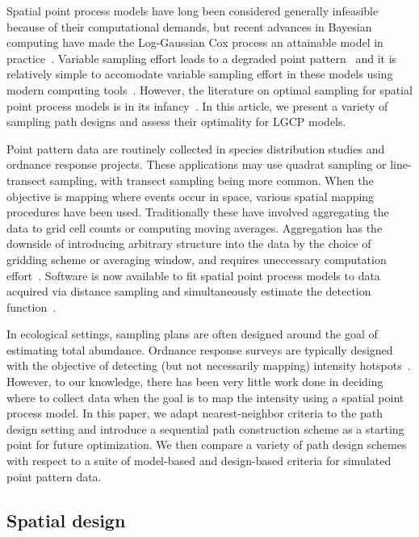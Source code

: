 \documentclass[review]{elsarticle}
\begin{document}
Spatial point process models have long been considered generally infeasible
because of their computational demands, but recent advances in Bayesian
computing have made the Log-Gaussian Cox process an attainable model in
practice~\citep{rueetal, lindgrenetal, illianetal, simpsonetal}. Variable
sampling effort leads to a degraded point pattern~\cite{chakrabortyetal} and
it is relatively simple to accomodate variable sampling effort in these models
using modern computing tools~\citep{yuanetal}. However, the literature on
optimal sampling for spatial point process models is in its
infancy~\citep{liuvanhatalo}. In this article, we present a variety of sampling
path designs and assess their optimality for LGCP models.

Point pattern data are routinely collected in species distribution studies and
ordnance response projects. These applications may use quadrat sampling or
line-transect sampling, with transect sampling being more common. When the
objective is mapping where events occur in space, various spatial mapping
procedures have been used. Traditionally these have involved aggregating the
data to grid cell counts or computing moving averages. Aggregation has the
downside of introducing arbitrary structure into the data by the choice of
gridding scheme or averaging window, and requires uneccessary computation
effort~\citep{simpsonetal}. Software is now available to fit spatial point
process models to data acquired via distance sampling and simultaneously
estimate the detection function~\citep{dspat,baser}.

In ecological settings, sampling plans are often designed around the goal of
estimating total abundance. Ordnance response surveys are typically designed
with the objective of detecting (but not necessarily mapping) intensity
hotspots~\citep{em200-1-15}. However, to our knowledge, there has been very
little work done in deciding where to collect data when the goal is to map the
intensity using a spatial point process model. In this paper, we adapt
nearest-neighbor criteria to the path design setting and introduce a sequential
path construction scheme as a starting point for future optimization. We then
compare a variety of path design schemes with respect to a suite of
model-based and design-based criteria for simulated point pattern data.


\subsection{Spatial design}
\end{document}
